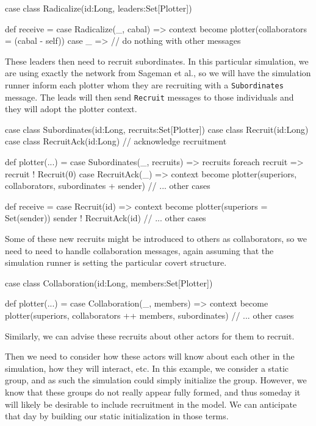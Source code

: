 \documentclass{article}
\begin{document}
\begin{code}
  case class Radicalize(id:Long, leaders:Set[Plotter])

  def receive = {
    case Radicalize(_, cabal) =>
      context become plotter(collaborators = (cabal - self))
    case _ => // do nothing with other messages
  }
\end{code}

These leaders then need to recruit subordinates.  In this particular simulation, we are using exactly the network from Sageman et al., so we will have the simulation runner inform each plotter whom they are recruiting with a \texttt{Subordinates} message.  The leads will then send \texttt{Recruit} messages to those individuals and they will adopt the plotter context.

\begin{code}
  case class Subordinates(id:Long, recruits:Set[Plotter])
  case class Recruit(id:Long)
  case class RecruitAck(id:Long) // acknowledge recruitment

  def plotter(...) = {
    case Subordinates(_, recruits) =>
      recruits foreach { recruit =>
        recruit ! Recruit(0)
      }
    case RecruitAck(_) =>
      context become plotter(superiors, collaborators, subordinates + sender)
    // ... other cases
  }
  
  def receive = {
    case Recruit(id) =>
      context become plotter(superiors = Set(sender))
      sender ! RecruitAck(id)
    // ... other cases
  }
\end{code}

Some of these new recruits might be introduced to others as collaborators, so we need to need to handle collaboration messages, again assuming that the simulation runner is setting the particular covert structure.

\begin{code}
  case class Collaboration(id:Long, members:Set[Plotter])

  def plotter(...) = {
    case Collaboration(_, members) =>
      context become plotter(superiors, collaborators ++ members, subordinates)
    // ... other cases
  }
\end{code}



Similarly, we can advise these recruits about other actors for them to recruit.

Then we need to consider how these actors will know about each other in the simulation, how they will interact, etc.  In this example, we consider a static group, and as such the simulation could simply initialize the group.  However, we know that these groups do not really appear fully formed, and thus someday it will likely be desirable to include recruitment in the model.  We can anticipate that day by building our static initialization in those terms.
\end{document}
